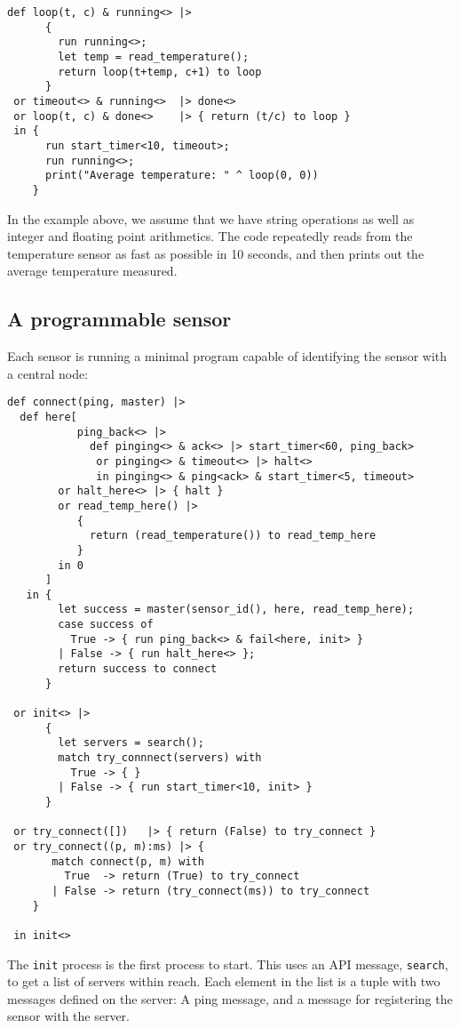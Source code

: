 \begin{verbatim}
def loop(t, c) & running<> |>
      {
        run running<>;
        let temp = read_temperature();
        return loop(t+temp, c+1) to loop
      }
 or timeout<> & running<>  |> done<>
 or loop(t, c) & done<>    |> { return (t/c) to loop }
 in {
      run start_timer<10, timeout>;
      run running<>;
      print("Average temperature: " ^ loop(0, 0))
    }
\end{verbatim}

In the example above, we assume that we have string operations as
well as integer and floating point arithmetics. The code repeatedly
reads from the temperature sensor as fast as possible in 10
seconds, and then prints out the average temperature measured.

\subsection{A programmable sensor}

Each sensor is running a minimal program capable of identifying the
sensor with a central node:

\begin{verbatim}
def connect(ping, master) |>
  def here[
           ping_back<> |>
             def pinging<> & ack<> |> start_timer<60, ping_back>
              or pinging<> & timeout<> |> halt<>
              in pinging<> & ping<ack> & start_timer<5, timeout>
        or halt_here<> |> { halt }
        or read_temp_here() |>
           {
             return (read_temperature()) to read_temp_here
           }
        in 0
      ]
   in {
        let success = master(sensor_id(), here, read_temp_here);
        case success of
          True -> { run ping_back<> & fail<here, init> }
        | False -> { run halt_here<> };
        return success to connect
      }

 or init<> |>
      {
        let servers = search();
        match try_connnect(servers) with
          True -> { }
        | False -> { run start_timer<10, init> }
      }

 or try_connect([])   |> { return (False) to try_connect }
 or try_connect((p, m):ms) |> {
       match connect(p, m) with
         True  -> return (True) to try_connect
       | False -> return (try_connect(ms)) to try_connect
    }

 in init<>
\end{verbatim}
The \verb!init! process is the first process to start. This uses an
API message, \verb!search!, to get a list of servers within reach.
Each element in the list is a tuple with two messages defined on
the server: A ping message, and a message for registering the
sensor with the server.

